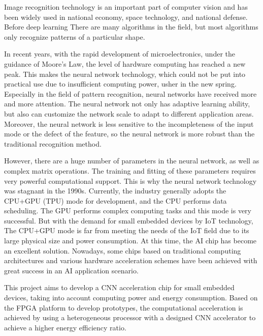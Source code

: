 \begin{enabstract}
  Image recognition technology is an important part of computer vision and has been widely used in national economy, space technology, and national defense. Before deep learning
  There are many algorithms in the field, but most algorithms only recognize patterns of a particular shape.

  In recent years, with the rapid development of microelectronics, under the guidance of Moore's Law, the level of hardware computing has reached a new peak.
  This makes the neural network technology, which could not be put into practical use due to insufficient computing power, usher in the new spring. Especially in the field of pattern recognition, neural networks have received more and more attention.
  The neural network not only has adaptive learning ability, but also can customize the network scale to adapt to different application areas.
  Moreover, the neural network is less sensitive to the incompleteness of the input mode or the defect of the feature, so the neural network is more robust than the traditional recognition method.

  However, there are a huge number of parameters in the neural network, as well as complex matrix operations. The training and fitting of these parameters requires very powerful computational support.
  This is why the neural network technology was stagnant in the 1990s. Currently, the industry generally adopts the CPU+GPU (TPU) mode for development, and the CPU performs data scheduling.
  The GPU performs complex computing tasks and this mode is very successful. But with the demand for small embedded devices by IoT technology,
  The CPU+GPU mode is far from meeting the needs of the IoT field due to its large physical size and power consumption. At this time, the AI chip has become an excellent solution.
  Nowadays, some chips based on traditional computing architectures and various hardware acceleration schemes have been achieved with great success in an AI application scenario.

  This project aims to develop a CNN acceleration chip for small embedded devices, taking into account computing power and energy consumption. Based on the FPGA platform to develop prototypes, the computational acceleration is achieved by using a heterogeneous processor with a designed CNN accelerator to achieve a higher energy efficiency ratio.

\end{enabstract}
